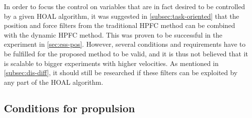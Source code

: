In order to focus the control on variables that are in fact desired to be controlled by a given HOAL algorithm, it was suggested in \ref{subsec:task-oriented} that the position and force filters from the traditional HPFC method can be combined with the dynamic HPFC method. This was proven to be successful in the experiment in \ref{sec:ess-pos}. However, several conditions and requirements have to be fulfilled for the proposed method to be valid, and it is thus not believed that it is scalable to bigger experiments with higher velocities. As mentioned in \ref{subsec:dis-diff}, it should still be researched if these filters can be exploited by any part of the HOAL algorithm.

\subsection{Conditions for propulsion}
